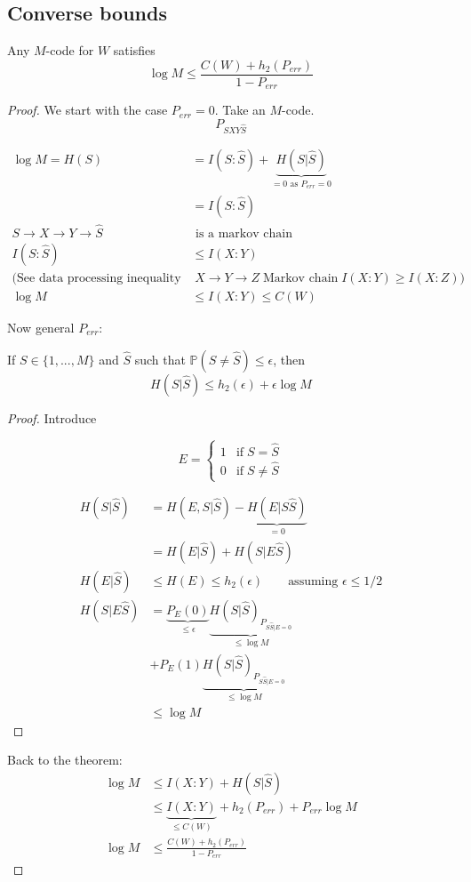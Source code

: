 \subsection{Converse bounds}
\begin{thm}
Any $M$-code for $W$ satisfies
\[\log M \leq \frac{C(W)+h_2(P_{err})}{1-P_{err}}\]
\end{thm}

\begin{proof}
We start with the case $P_{err}=0$. Take an $M$-code.
\[P_{SXY\hat{S}}\]

\begin{align*}
\log M = H(S) & = I(S:\hat{S})+\underbrace{H(S|\hat{S})}_{=0 \text{ as } P_{err}=0}\\
& = I(S:\hat{S})\\
S\to X \to Y \to \hat{S} & \text{ is a markov chain}\\
I(S:\hat{S}) & \leq I(X:Y)\\
(\text{See data processing inequality in tutorial:} & \; X\to Y \to Z \; \text{Markov chain}\; I(X:Y)\geq I(X:Z))\\
\log M & \leq I(X:Y)\leq C(W)
\end{align*}

Now general $P_{err}$:
\begin{lemma}
If $S\in \{1,...,M\}$ and $\hat{S}$ such that $\mathbb{P}(S\neq\hat{S})\leq \epsilon$, then
\[H(S|\hat{S})\leq h_2(\epsilon)+\epsilon \log M\]
\end{lemma}
\begin{proof}
Introduce

\[E = \begin{cases}
1 & \text{if}\; S=\hat{S}\\
0 & \text{if}\; S\neq \hat{S}
\end{cases}\]

\begin{align*}
H(S|\hat{S}) & = H(E,S|\hat{S})-\underbrace{H(E|S\hat{S})}_{=0}\\
& = H(E|\hat{S})+H(S|E\hat{S})\\
H(E|\hat{S}) & \leq H(E) \leq h_2(\epsilon) \qquad \text{assuming $\epsilon\leq 1/2$}\\
H(S|E\hat{S}) &= \underbrace{P_E(0)}_{\leq \epsilon} \underbrace{H(S|\hat{S})_{P_{S\hat{S}|E=0}}}_{\leq \log M}\\
& + P_E(1)\underbrace{H(S|\hat{S})_{P_{S\hat{S}|E=0}}}_{\leq \log M}\\
& \leq \log M
\end{align*}
\end{proof}
Back to the theorem:
\begin{align*}
\log M & \leq I(X:Y) + H(S|\hat{S})\\
& \leq \underbrace{I(X:Y)}_{\leq C(W)}+h_2(P_{err})+P_{err} \log M\\
\log M & \leq \frac{C(W)+h_2(P_{err})}{1-P_{err}}
\end{align*}
\end{proof}

